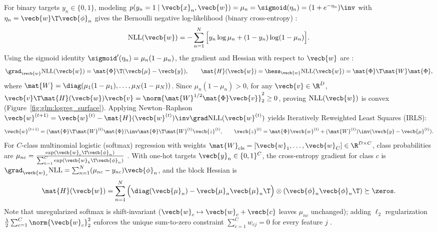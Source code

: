 \documentclass[../../../../master.tex]{subfiles}
\begin{document}
\begin{coremath}
For binary targets $y_n \in \{0,1\}$, modeling $p(y_n=1 \mid \vecb{x}_n, \vecb{w}) = \mu_n = \sigmoid(\eta_n) = (1 + e^{-\eta_n})\inv$ with $\eta_n = \vecb{w}\T\vecb{\phi}_n$ gives the Bernoulli negative log-likelihood (binary cross-entropy) :
\begin{equation}
\label{eq:glm:bce}
\mathrm{NLL}(\vecb{w}) = -\sum_{n=1}^N \Big[y_n\log\mu_n + (1-y_n)\log(1-\mu_n)\Big].
\end{equation}
Using the sigmoid identity $\sigmoid'(\eta_n) = \mu_n(1-\mu_n)$, the gradient and Hessian with respect to $\vecb{w}$ are :
\begin{equation}
\label{eq:glm:logreg_grad_hess}
\grad_{\vecb{w}}\mathrm{NLL}(\vecb{w}) = \mat{\Phi}\T(\vecb{\mu} - \vecb{y}), \qquad
\mat{H}(\vecb{w}) = \hess_{\vecb{w}}\mathrm{NLL}(\vecb{w}) = \mat{\Phi}\T\mat{W}\mat{\Phi},
\end{equation}
where $\mat{W} = \diag(\mu_1(1-\mu_1), \dots, \mu_N(1-\mu_N))$. Since $\mu_n(1-\mu_n) > 0$, for any $\vecb{v} \in \R^D$, $\vecb{v}\T\mat{H}(\vecb{w})\vecb{v} = \norm{\mat{W}^{1/2}\mat{\Phi}\vecb{v}}_2^2 \ge 0$, proving $\mathrm{NLL}(\vecb{w})$ is convex (Figure~\ref{fig:glm:logreg_surface}). Applying Newton--Raphson $\vecb{w}^{(t+1)} = \vecb{w}^{(t)} - \mat{H}(\vecb{w}^{(t)})\inv \grad\mathrm{NLL}(\vecb{w}^{(t)})$ yields Iteratively Reweighted Least Squares (IRLS):
\begin{equation}
\label{eq:glm:irls_update}
\vecb{w}^{(t+1)} = (\mat{\Phi}\T\mat{W}^{(t)}\mat{\Phi})\inv \mat{\Phi}\T\mat{W}^{(t)}\vecb{z}^{(t)}, \qquad
\vecb{z}^{(t)} = \mat{\Phi}\vecb{w}^{(t)} + (\mat{W}^{(t)})\inv(\vecb{y} - \vecb{\mu}^{(t)}).
\end{equation}
For $C$-class multinomial logistic (softmax) regression with weights $\mat{W}_{\mathrm{cls}} = [\vecb{w}_1,\dots,\vecb{w}_C] \in \R^{D \times C}$, class probabilities are $\mu_{nc} = \frac{\exp(\vecb{w}_c\T\vecb{\phi}_n)}{\sum_{k=1}^C\exp(\vecb{w}_k\T\vecb{\phi}_n)}$ . With one-hot targets $\vecb{y}_n \in \{0,1\}^C$, the cross-entropy gradient for class $c$ is $\grad_{\vecb{w}_c}\mathrm{NLL} = \sum_{n=1}^N (\mu_{nc} - y_{nc})\vecb{\phi}_n$, and the block Hessian is 
\begin{equation}
\label{eq:glm:softmax_hess}
\mat{H}(\vecb{w}) = \sum_{n=1}^N \Big(\diag(\vecb{\mu}_n) - \vecb{\mu}_n\vecb{\mu}_n\T\Big) \otimes (\vecb{\phi}_n\vecb{\phi}_n\T) \succeq \zeros.
\end{equation}
Note that unregularized softmax is shift-invariant ($\vecb{w}_c \mapsto \vecb{w}_c + \vecb{c}$ leaves $\mu_{nc}$ unchanged); adding $\ell_2$ regularization $\frac{\lambda}{2}\sum_{c=1}^C\norm{\vecb{w}_c}_2^2$ enforces the unique sum-to-zero constraint $\sum_{c=1}^C \hat{w}_{cj} = 0$ for every feature $j$ .
\end{coremath}
\end{document}

